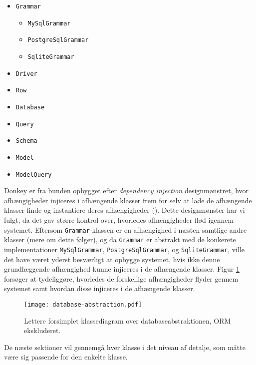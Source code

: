 \begin{multicols}{3}
\begin{itemize}
  \item \texttt{Grammar}
    \begin{itemize}
      \item \texttt{MySqlGrammar}
      \item \texttt{PostgreSqlGrammar}
      \item \texttt{SqliteGrammar}
    \end{itemize}
  \item \texttt{Driver}
  \item \texttt{Row}
  \item \texttt{Database}
  \item \texttt{Query}
  \item \texttt{Schema}
  \item \texttt{Model}
  \item \texttt{ModelQuery}
\end{itemize}
\end{multicols}

Donkey er fra bunden opbygget efter \textit{dependency injection} designmønstret, hvor afhængigheder injiceres i afhængende klasser frem for selv at lade de afhængende klasser finde og instantiere deres afhængigheder (\cite{wiki:di}). Dette designmønster har vi fulgt, da det gav større kontrol over, hvorledes afhængigheder flød igennem systemet. Eftersom \texttt{Grammar}-klassen er en afhængighed i næsten samtlige andre klasser (mere om dette følger), og da \texttt{Grammar} er abstrakt med de konkerete implementationer \texttt{MySqlGrammar}, \texttt{PostgreSqlGrammar}, og \texttt{SqliteGrammar}, ville det have været yderst besværligt at opbygge systemet, hvis ikke denne grundlæggende afhængighed kunne injiceres i de afhængende klasser. Figur \ref{class-diagram:database-abstraction} forsøger at tydeliggøre, hvorledes de forskellige afhængigheder flyder gennem systemet samt hvordan disse injiceres i de afhængende klasser.

\begin{figure}[h]
  \centering
  \texttt{[image: database-abstraction.pdf]}
  \caption{Lettere forsimplet klassediagram over databaseabstraktionen, ORM ekskluderet.}
  \label{class-diagram:database-abstraction}
\end{figure}

De næste sektioner vil gennemgå hver klasse i det niveau af detalje, som måtte være sig passende for den enkelte klasse.

